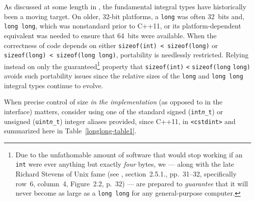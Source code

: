As discussed at some length in ,
the
fundamental integral types have historically been a moving target. On
older, 32-bit platforms, a \lstinline!long! was often 32~bits and, \lstinline!long!~\lstinline!long!, which was nonstandard prior to C++11, or its platform-dependent equivalent was needed to ensure that 64~bits were
available. When the correctness of code depends on either
\lstinline!sizeof(int)!~\lstinline!<!~\lstinline!sizeof(long)! or
\lstinline!sizeof(long)!~\lstinline!<!~\lstinline!sizeof(long!~\lstinline!long)!,
portability is needlessly restricted. Relying instead on only the
guaranteed{\cprotect\footnote{Due to the unfathomable amount of software
that would stop working if an \lstinline!int! were ever anything but
exactly \emph{four} bytes, we --- along with the late Richard Stevens
  of Unix fame (see \cite{stevens93}, section~2.5.1., pp.~31--32, specifically row~6, column~4, Figure~2.2, p.~32) --- are prepared
  to \emph{guarantee} that it will never become as large as a
  \lstinline!long!~\lstinline!long! for any general-purpose computer.}}
property that
\lstinline!sizeof(int)! \lstinline!<! \lstinline!sizeof(long! \lstinline!long)!
avoids such portability issues since the relative sizes of the \lstinline!long! and \lstinline!long!~\lstinline!long! integral
types continue to evolve.

When precise control of size \emph{in the implementation} (as opposed to
in the interface) matters, consider using one of the standard signed
(\texttt{int{\itshape n}\_t}) or unsigned (\texttt{uint{\itshape n}\_t}) integer
aliases provided, since C++11, in \lstinline!<cstdint>! and
summarized here in Table~\ref{longlong-table1}.%

